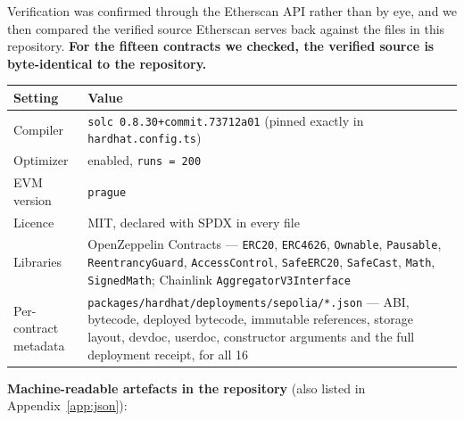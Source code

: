 \documentclass[11pt,a4paper]{article}
\begin{document}
Verification was confirmed through the Etherscan API rather than by eye, and we then compared the
verified source Etherscan serves back against the files in this repository. \textbf{For the fifteen
contracts we checked, the verified source is byte-identical to the repository.}

\begin{center}
\small
\begin{tabular}{@{}p{4.6cm}p{10.6cm}@{}}
\toprule
\textbf{Setting} & \textbf{Value} \\
\midrule
Compiler & \texttt{solc 0.8.30+commit.73712a01} (pinned exactly in \texttt{hardhat.config.ts}) \\
Optimizer & enabled, \texttt{runs = 200} \\
EVM version & \texttt{prague} \\
Licence & MIT, declared with SPDX in every file \\
Libraries & OpenZeppelin Contracts — \texttt{ERC20}, \texttt{ERC4626}, \texttt{Ownable}, \texttt{Pausable}, \texttt{ReentrancyGuard}, \texttt{AccessControl}, \texttt{SafeERC20}, \texttt{SafeCast}, \texttt{Math}, \texttt{SignedMath}; Chainlink \texttt{AggregatorV3Interface} \\
Per-contract metadata & \texttt{packages/hardhat/deployments/sepolia/*.json} — ABI, bytecode, deployed bytecode, immutable references, storage layout, devdoc, userdoc, constructor arguments and the full deployment receipt, for all 16 \\
\bottomrule
\end{tabular}
\end{center}

\textbf{Machine-readable artefacts in the repository} (also listed in Appendix~\ref{app:json}):
\end{document}
